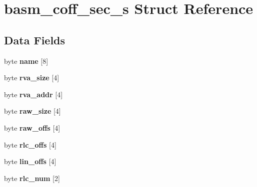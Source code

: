\hypertarget{structbasm__coff__sec__s}{\section{basm\-\_\-coff\-\_\-sec\-\_\-s Struct Reference}
\label{structbasm__coff__sec__s}
}
\subsection*{Data Fields}
\begin{DoxyCompactItemize}
\item 
\hypertarget{structbasm__coff__sec__s_a48d35bf52f0fce397d70e699f7144b55}{byte {\bfseries name} \mbox{[}8\mbox{]}}\label{structbasm__coff__sec__s_a48d35bf52f0fce397d70e699f7144b55}

\item 
\hypertarget{structbasm__coff__sec__s_a12cf678a0f1b2ef6f3b6e0f842791785}{byte {\bfseries rva\-\_\-size} \mbox{[}4\mbox{]}}\label{structbasm__coff__sec__s_a12cf678a0f1b2ef6f3b6e0f842791785}

\item 
\hypertarget{structbasm__coff__sec__s_a83f91943c697d122fc7463712d6f690e}{byte {\bfseries rva\-\_\-addr} \mbox{[}4\mbox{]}}\label{structbasm__coff__sec__s_a83f91943c697d122fc7463712d6f690e}

\item 
\hypertarget{structbasm__coff__sec__s_ab09717e15f3090f1181a7e2b993b8e53}{byte {\bfseries raw\-\_\-size} \mbox{[}4\mbox{]}}\label{structbasm__coff__sec__s_ab09717e15f3090f1181a7e2b993b8e53}

\item 
\hypertarget{structbasm__coff__sec__s_af11d375f25ea81193a8713ab6068417e}{byte {\bfseries raw\-\_\-offs} \mbox{[}4\mbox{]}}\label{structbasm__coff__sec__s_af11d375f25ea81193a8713ab6068417e}

\item 
\hypertarget{structbasm__coff__sec__s_a713c7d17dff51466928fd966d2b7a84c}{byte {\bfseries rlc\-\_\-offs} \mbox{[}4\mbox{]}}\label{structbasm__coff__sec__s_a713c7d17dff51466928fd966d2b7a84c}

\item 
\hypertarget{structbasm__coff__sec__s_aed8449c703141126ea41a22d45f1466e}{byte {\bfseries lin\-\_\-offs} \mbox{[}4\mbox{]}}\label{structbasm__coff__sec__s_aed8449c703141126ea41a22d45f1466e}

\item 
\hypertarget{structbasm__coff__sec__s_a624e76e6d7d21bce4cd5dd484e4fe040}{byte {\bfseries rlc\-\_\-num} \mbox{[}2\mbox{]}}\label{structbasm__coff__sec__s_a624e76e6d7d21bce4cd5dd484e4fe040}


\end{DoxyCompactItemize}
